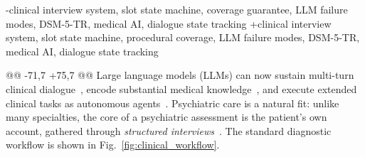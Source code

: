  \begin{IEEEkeywords}
-clinical interview system, slot state machine, coverage guarantee, LLM failure modes, DSM-5-TR, medical AI, dialogue state tracking
+clinical interview system, slot state machine, procedural coverage, LLM failure modes, DSM-5-TR, medical AI, dialogue state tracking
 \end{IEEEkeywords}
 
 
@@ -71,7 +75,7 @@
 Large language models (LLMs) can now sustain multi-turn clinical dialogue~\cite{tu2025towards,johri2025evaluation}, encode substantial medical knowledge~\cite{thirunavukarasu2023large}, and execute extended clinical tasks as autonomous agents~\cite{kim2024mdagents,ferber2025development}. Psychiatric care is a natural fit: unlike many specialties, the core of a psychiatric assessment is the patient's own account, gathered through \emph{structured interviews}~\cite{abi2023candidate,hua2025charting}. The standard diagnostic workflow is shown in Fig.~\ref{fig:clinical_workflow}.
 
